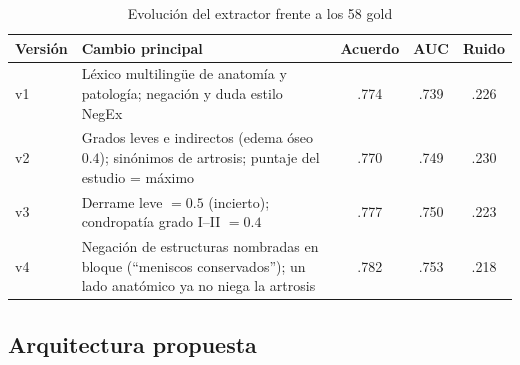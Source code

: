\documentclass[conference]{IEEEtran}
\begin{document}
\begin{table}[t]
  \caption{Evolución del extractor frente a los 58 gold}
  \label{tab:ext-versiones}
  \centering
  \footnotesize
  \setlength{\tabcolsep}{4pt}
  \begin{tabular}{@{}lp{}ccc@{}}
    \toprule
    Versión & Cambio principal & Acuerdo & AUC & Ruido \\
    \midrule
    v1 & Léxico multilingüe de anatomía y patología; negación y duda estilo NegEx & .774 & .739 & .226 \\
    v2 & Grados leves e indirectos (edema óseo $0.4$); sinónimos de artrosis; puntaje del estudio = máximo & .770 & .749 & .230 \\
    v3 & Derrame leve $=0.5$ (incierto); condropatía grado I--II $=0.4$ & .777 & .750 & .223 \\
    v4 & Negación de estructuras nombradas en bloque (``meniscos conservados''); un lado anatómico ya no niega la artrosis & .782 & .753 & .218 \\
    \bottomrule
  \end{tabular}
\end{table}

\subsection{Arquitectura propuesta}
\label{sec:arquitectura}
\end{document}
